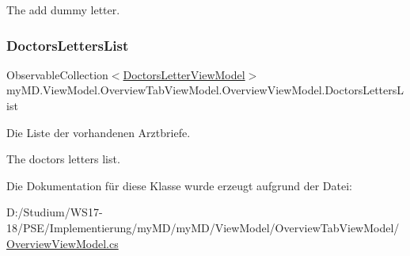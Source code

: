 The add dummy letter.\mbox{\label{classmy_m_d_1_1_view_model_1_1_overview_tab_view_model_1_1_overview_view_model_ab0450e3df5b99c435084ad74c2ea65d0}} 
\subsubsection{\texorpdfstring{Doctors\+Letters\+List}{DoctorsLettersList}}
{\footnotesize\ttfamily Observable\+Collection$<$\mbox{\hyperlink{classmy_m_d_1_1_view_model_1_1_overview_tab_view_model_1_1_doctors_letter_view_model}{Doctors\+Letter\+View\+Model}}$>$ my\+M\+D.\+View\+Model.\+Overview\+Tab\+View\+Model.\+Overview\+View\+Model.\+Doctors\+Letters\+List\hspace{0.3cm}{\ttfamily [get]}}



Die Liste der vorhandenen Arztbriefe. 

The doctors letters list.

Die Dokumentation für diese Klasse wurde erzeugt aufgrund der Datei\+:\begin{DoxyCompactItemize}
\item 
D\+:/\+Studium/\+W\+S17-\/18/\+P\+S\+E/\+Implementierung/my\+M\+D/my\+M\+D/\+View\+Model/\+Overview\+Tab\+View\+Model/\mbox{\hyperlink{_overview_view_model_8cs}{Overview\+View\+Model.\+cs}}\end{DoxyCompactItemize}
